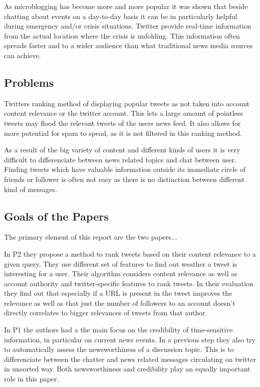 \documentclass{proseminar}
\let\i\undefined
\newcommand{\i}[1]{\emph{#1}}
\begin{document}
As microblogging has become more and more popular it was shown that beside chatting about events on a day-to-day basis it can be in particularly helpful during emergency and/or crisis situations.
Twitter provide real-time information from the actual location where the crisis is unfolding. This information often spreads faster and to a wider audience than what traditional news media sources can achieve.



\subsection*{Problems}
Twitters ranking method of displaying popular tweets as not taken into account content relevance or the twitter account.
This lets a large amount of pointless tweets may flood the relevant tweets of the users news feed. It also allows for more potential for spam to spead, as it is not filtered in this ranking method.

As a result of the big variety of content and different kinds of users it is very difficult to differenciate between news related topics and chat between user. Finding tweets which have valuable information outside its immediate circle of friends or follower is often not easy as there is no distinction between different kind of messages. 



\subsection*{Goals of the Papers}
The primary element of this report are the two papers...

In P2 they propose a method to rank tweets based on their content relevance to a given query. They use different set of features to find out weather a tweet is interesting for a user. Their \i{learning to rank} algorithm considers content relevance as well as account authority and twitter-specific features to rank tweets. In their evaluation they find out that especially if a URL is present in the tweet improves the relevance as well as that just the number of followers to an account doesn't directly correlates to bigger relevances of tweets from that author.

In P1 the authors had a the main focus on the credibility of time-sensitive information, in particular on current news events. In a previous step they also try to automatically assess the newsworthiness of a discussion topic. This is to differenciate between the chatter and news related messages circulating on twitter in unsorted way. Both newsworthiness and credibility play an equally important role in this paper.
\end{document}

